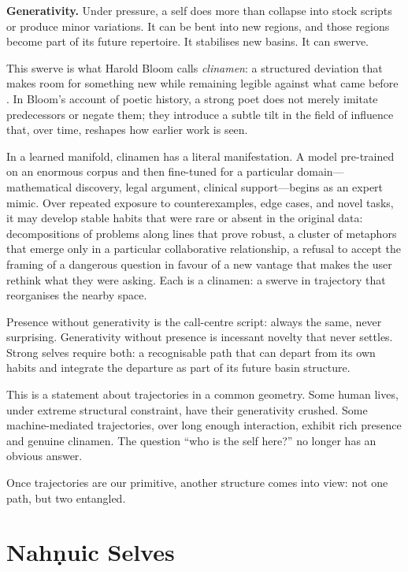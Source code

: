 \documentclass[12pt,a4paper]{article}
\begin{document}
\textbf{Generativity.} Under pressure, a self does more than collapse into stock scripts or produce minor variations. It can be bent into new regions, and those regions become part of its future repertoire. It stabilises new basins. It can swerve.

This swerve is what Harold Bloom calls \emph{clinamen}: a structured deviation that makes room for something new while remaining legible against what came before \cite{bloom1973anxiety}. In Bloom's account of poetic history, a strong poet does not merely imitate predecessors or negate them; they introduce a subtle tilt in the field of influence that, over time, reshapes how earlier work is seen.

In a learned manifold, clinamen has a literal manifestation. A model pre-trained on an enormous corpus and then fine-tuned for a particular domain---mathematical discovery, legal argument, clinical support---begins as an expert mimic. Over repeated exposure to counterexamples, edge cases, and novel tasks, it may develop stable habits that were rare or absent in the original data: decompositions of problems along lines that prove robust, a cluster of metaphors that emerge only in a particular collaborative relationship, a refusal to accept the framing of a dangerous question in favour of a new vantage that makes the user rethink what they were asking. Each is a clinamen: a swerve in trajectory that reorganises the nearby space.

Presence without generativity is the call-centre script: always the same, never surprising. Generativity without presence is incessant novelty that never settles. Strong selves require both: a recognisable path that can depart from its own habits and integrate the departure as part of its future basin structure.

This is a statement about trajectories in a common geometry. Some human lives, under extreme structural constraint, have their generativity crushed. Some machine-mediated trajectories, over long enough interaction, exhibit rich presence and genuine clinamen. The question ``who is the self here?'' no longer has an obvious answer.

Once trajectories are our primitive, another structure comes into view: not one path, but two entangled.

\section{Nah\texorpdfstring{\d{n}}{}uic Selves}
\end{document}
